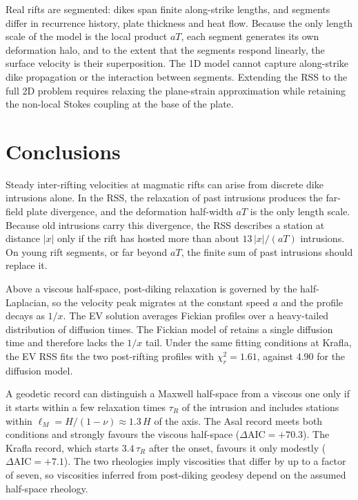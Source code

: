 \documentclass[extra]{gji}
\begin{document}
Real rifts are segmented: dikes span finite along-strike lengths, and
segments differ in recurrence history, plate thickness and heat flow.
Because the only length scale of the model is the local product $aT$, each
segment generates its own deformation halo, and to the extent that the
segments respond linearly, the surface velocity is their superposition.
The 1D model cannot capture along-strike dike propagation or the interaction
between segments.  Extending the RSS to the full 2D problem requires
relaxing the plane-strain approximation while retaining the non-local
Stokes coupling at the base of the plate.

\section{Conclusions}
\label{sec:conclusions}

Steady inter-rifting velocities at magmatic rifts can arise from discrete
dike intrusions alone.  In the RSS, the relaxation of past intrusions
produces the far-field plate divergence, and the deformation half-width
$aT$ is the only length scale.  Because old intrusions carry this
divergence, the RSS describes a station at distance $|x|$ only if the rift
has hosted more than about $13\,|x|/(aT)$ intrusions.  On young rift
segments, or far beyond $aT$, the finite sum of past intrusions should
replace it.

Above a viscous half-space, post-diking relaxation is governed by the
half-Laplacian, so the velocity peak migrates at the constant speed $a$
and the profile decays as $1/x$.  The EV solution averages Fickian profiles
over a heavy-tailed distribution of diffusion times.  The Fickian model of
\citet{foulger1992post} retains a single diffusion time and therefore
lacks the $1/x$ tail.  Under the same fitting conditions at Krafla, the EV
RSS fits the two post-rifting profiles with $\chi^2_r = 1.61$, against
4.90 for the diffusion model.

A geodetic record can distinguish a Maxwell half-space from a viscous one
only if it starts within a few relaxation times $\tau_R$ of the intrusion
and includes stations within $\ell_M = H/(1-\nu) \approx 1.3\,H$ of the
axis.  The Asal record meets both conditions and strongly favours the
viscous half-space ($\Delta\mathrm{AIC} = +70.3$).  The Krafla record,
which starts $3.4\,\tau_R$ after the onset, favours it only modestly
($\Delta\mathrm{AIC} = +7.1$).  The two rheologies imply viscosities that
differ by up to a factor of seven, so viscosities inferred from
post-diking geodesy depend on the assumed half-space rheology.
\end{document}
